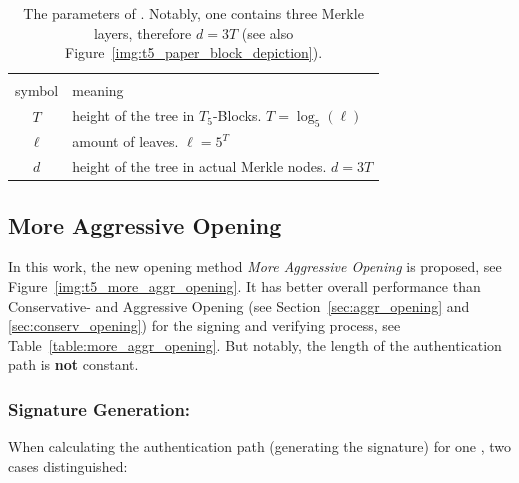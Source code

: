 \begin{table}
\centering
\begin{tabular}{c l}
 \hline\noalign{\smallskip}
 \multicolumn{2}{c}{\textbf{\extree Parameter}} \\
 symbol & meaning \\
 \hline\noalign{\smallskip} 
 $T$ & height of the tree in $T_5$-Blocks. $T = \log_5(\ell)$ \\
  $\ell$ & amount of leaves. $\ell = 5^T$ \\
 $d$ & height of the tree in actual Merkle nodes. $d = 3T$ \\
 \hline
\end{tabular}
\caption{The parameters of \extree. Notably, one \tfblock contains three Merkle layers, therefore $d=3T$ (see also Figure~\ref{img:t5_paper_block_depiction}).} %
\label{table:t5_ext_parameter}
\end{table}

\subsection{More Aggressive Opening}
\label{sec:more_aggr_opening}
In this work, the new opening method \textit{More Aggressive Opening} is proposed, see Figure~\ref{img:t5_more_aggr_opening}. It has better overall performance than Conservative- and Aggressive Opening (see Section~\ref{sec:aggr_opening} and \ref{sec:conserv_opening}) for the signing and verifying process, see Table~\ref{table:more_aggr_opening}. But notably, the length of the authentication path is \textbf{not} constant.

\subsubsection{Signature Generation: \texorpdfstring{\tfblock}{T5-Block}}
When calculating the authentication path (generating the signature) for one \tfblock, two cases distinguished:

